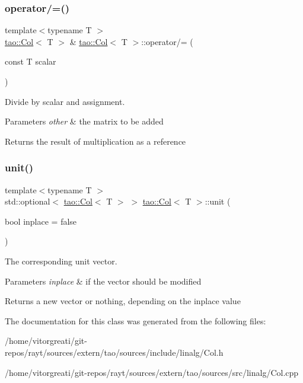 \subsubsection{\texorpdfstring{operator/=()}{operator/=()}\hspace{0.1cm}{\footnotesize\ttfamily [2/2]}}
{\footnotesize\ttfamily template$<$typename T $>$ \\
\mbox{\hyperlink{classtao_1_1_col}{tao\+::\+Col}}$<$ T $>$ \& \mbox{\hyperlink{classtao_1_1_col}{tao\+::\+Col}}$<$ T $>$\+::operator/= (\begin{DoxyParamCaption}\item[{const T}]{scalar }\end{DoxyParamCaption})}



Divide by scalar and assignment. 


\begin{DoxyParams}{Parameters}
{\em other} & the matrix to be added \\
\hline
\end{DoxyParams}
\begin{DoxyReturn}{Returns}
the result of multiplication as a reference 
\end{DoxyReturn}
\mbox{\label{classtao_1_1_col_ae913e98d4ed12cc7ee1975b2aff07c05}} 
\subsubsection{\texorpdfstring{unit()}{unit()}}
{\footnotesize\ttfamily template$<$typename T $>$ \\
std\+::optional$<$ \mbox{\hyperlink{classtao_1_1_col}{tao\+::\+Col}}$<$ T $>$ $>$ \mbox{\hyperlink{classtao_1_1_col}{tao\+::\+Col}}$<$ T $>$\+::unit (\begin{DoxyParamCaption}\item[{bool}]{inplace = {\ttfamily false} }\end{DoxyParamCaption})}



The corresponding unit vector. 


\begin{DoxyParams}{Parameters}
{\em inplace} & if the vector should be modified \\
\hline
\end{DoxyParams}
\begin{DoxyReturn}{Returns}
a new vector or nothing, depending on the inplace value 
\end{DoxyReturn}


The documentation for this class was generated from the following files\+:\begin{DoxyCompactItemize}
\item 
/home/vitorgreati/git-\/repos/rayt/sources/extern/tao/sources/include/linalg/Col.\+h\item 
/home/vitorgreati/git-\/repos/rayt/sources/extern/tao/sources/src/linalg/Col.\+cpp\end{DoxyCompactItemize}
